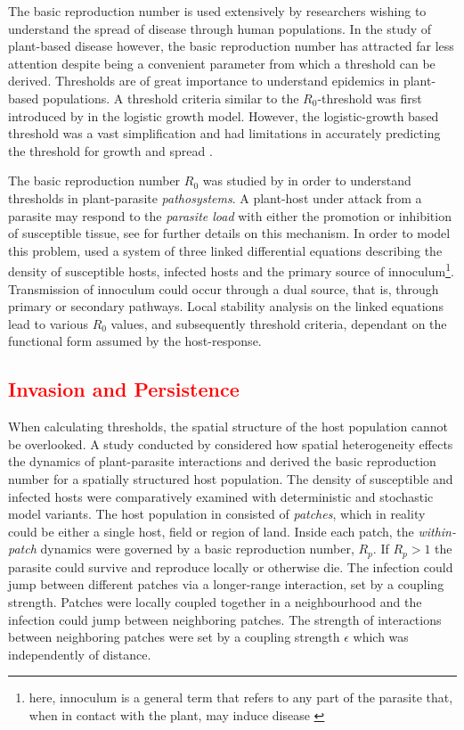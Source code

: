 The basic reproduction number is used extensively by researchers wishing to understand the spread of disease through human populations. In the study of plant-based disease however, the basic reproduction number has attracted far less attention despite being a convenient parameter from which a threshold can be derived. Thresholds are of great importance to understand epidemics in plant-based populations. A threshold criteria similar to the $R_0$-threshold was first introduced by \cite{van2013plant} in the logistic growth model. However, the logistic-growth based threshold was a vast simplification and had limitations in accurately predicting the threshold for growth and spread \cite{onstad1992evaluation}.

The basic reproduction number $R_0$ was studied by \cite{gubbins2000population} in order to understand thresholds in plant-parasite \textit{pathosystems}. A plant-host under attack from a parasite may respond to the \textit{parasite load} with either the promotion or inhibition of susceptible tissue, see \cite{gilligan1997analysis} for further details on this mechanism. In order to model this problem, \cite{gubbins2000population} used a system of three linked differential equations describing the density of susceptible hosts, infected hosts and the primary source of innoculum\footnote{\textemdash here, innoculum is a general term that refers to any part of the parasite that, when in contact with the plant, may induce disease \cite{agrios2005chapter}}. Transmission of innoculum could occur through a dual source, that is, through primary or secondary pathways. Local stability analysis on the linked equations lead to various $R_0$ values, and subsequently threshold criteria, dependant on the functional form assumed by the host-response.\\

\subsection{\textcolor{red}{Invasion and Persistence}}
\label{ch3:invasions_and_persistence}
When calculating thresholds, the spatial structure of the host population cannot be overlooked. A study conducted by \cite{park2001invasion} considered how spatial heterogeneity effects the dynamics of plant-parasite interactions and derived the basic reproduction number for a spatially structured host population. The density of susceptible and infected hosts were comparatively examined with deterministic and stochastic model variants. The host population in \cite{park2001invasion} consisted of \textit{patches}, which in reality could be either a single host, field or region of land. Inside each patch, the \textit{within-patch} dynamics were governed by a basic reproduction number, $R_p$. If $R_p > 1$ the parasite could survive and reproduce locally or otherwise die. The infection could jump between different patches via a longer-range interaction, set by a coupling strength. Patches were locally coupled together in a neighbourhood and the infection could jump between neighboring patches. The strength of interactions between neighboring patches were set by a coupling strength $\epsilon$ which was independently of distance.

